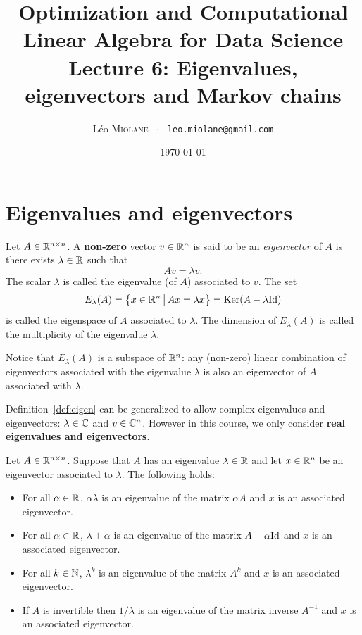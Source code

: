 \documentclass[11pt,nocut]{article}
\title{\vspace{-2.0cm}%
	Optimization and Computational Linear Algebra for Data Science\\
Lecture 6: Eigenvalues, eigenvectors and Markov chains}
\author{Léo \textsc{Miolane} \ $\cdot$ \ \texttt{leo.miolane@gmail.com}}
\date{\today}
\begin{document}
\maketitle


\section{Eigenvalues and eigenvectors}

\begin{definition}\label{def:eigen}
	Let $A \in \mathbb{R}^{n \times n}$. A \textbf{non-zero} vector $v \in \mathbb{R}^n$ is said to be an \emph{eigenvector} of $A$ is there exists $\lambda \in \mathbb{R}$ such that
	$$
	A v = \lambda v.
	$$
	The scalar $\lambda$ is called the eigenvalue (of $A$) associated to $v$. The set
	$$
	E_{\lambda}(A) = \big\{ x \in \mathbb{R}^n \, \big| \, Ax = \lambda x \big\} = {{\rm Ker}}(A-\lambda {{\rm Id}})
	$$
	is called the eigenspace of $A$ associated to $\lambda$. The dimension of $E_{\lambda}(A)$ is called the multiplicity of the eigenvalue $\lambda$.
\end{definition}

\begin{remark}
	Notice that $E_{\lambda}(A)$ is a subspace of $\mathbb{R}^n$: any (non-zero) linear combination of eigenvectors associated with the eigenvalue $\lambda$ is also an eigenvector of $A$ associated with $\lambda$.
\end{remark}

\begin{remark}
	Definition~\ref{def:eigen} can be generalized to allow complex eigenvalues and eigenvectors: $\lambda \in \mathbb{C}$ and $v \in \mathbb{C}^n$.
	However in this course, we only consider \textbf{real eigenvalues and eigenvectors}. 
\end{remark}

\begin{proposition}
	Let $A \in \mathbb{R}^{n \times n}$. 
	Suppose that $A$ has an eigenvalue $\lambda \in \mathbb{R}$ and let $x \in \mathbb{R}^n$ be an eigenvector associated to $\lambda$.
	The following holds:
	\begin{itemize}
		\item For all $\alpha \in \mathbb{R}$, $\alpha \lambda$ is an eigenvalue of the matrix $\alpha A$ and $x$ is an associated eigenvector.
		\item For all $\alpha \in \mathbb{R}$, $\lambda + \alpha$ is an eigenvalue of the matrix $A + \alpha {{\rm Id}}$ and $x$ is an associated eigenvector.
		\item For all $k \in \mathbb{N}$, $\lambda^k$ is an eigenvalue of the matrix $A^k$ and $x$ is an associated eigenvector.
		\item If $A$ is invertible then $1/\lambda$ is an eigenvalue of the matrix inverse $A^{-1}$ and $x$ is an associated eigenvector.
	\end{itemize}
\end{proposition}
\end{document}
